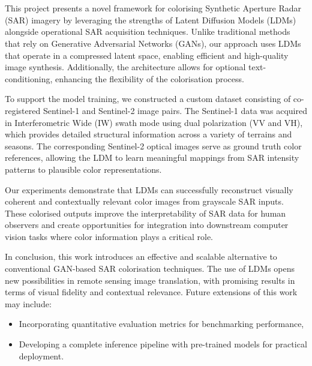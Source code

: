 \section*{}

This project presents a novel framework for colorising Synthetic Aperture Radar (SAR) imagery by leveraging the strengths of Latent Diffusion Models (LDMs) alongside operational SAR acquisition techniques. Unlike traditional methods that rely on Generative Adversarial Networks (GANs), our approach uses LDMs that operate in a compressed latent space, enabling efficient and high-quality image synthesis. Additionally, the architecture allows for optional text-conditioning, enhancing the flexibility of the colorisation process.

To support the model training, we constructed a custom dataset consisting of co-registered Sentinel-1 and Sentinel-2 image pairs. The Sentinel-1 data was acquired in Interferometric Wide (IW) swath mode using dual polarization (VV and VH), which provides detailed structural information across a variety of terrains and seasons. The corresponding Sentinel-2 optical images serve as ground truth color references, allowing the LDM to learn meaningful mappings from SAR intensity patterns to plausible color representations.

Our experiments demonstrate that LDMs can successfully reconstruct visually coherent and contextually relevant color images from grayscale SAR inputs. These colorised outputs improve the interpretability of SAR data for human observers and create opportunities for integration into downstream computer vision tasks where color information plays a critical role.

In conclusion, this work introduces an effective and scalable alternative to conventional GAN-based SAR colorisation techniques. The use of LDMs opens new possibilities in remote sensing image translation, with promising results in terms of visual fidelity and contextual relevance. Future extensions of this work may include:
\begin{itemize}
    \item Incorporating quantitative evaluation metrics for benchmarking performance,
    \item Developing a complete inference pipeline with pre-trained models for practical deployment.
\end{itemize}
